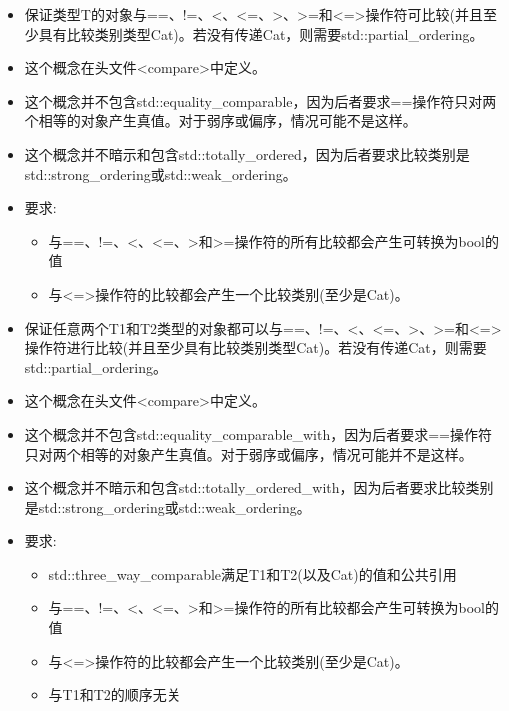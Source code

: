 

\begin{itemize}
\item
保证类型T的对象与==、!=、<、<=、>、>=和<=>操作符可比较(并且至少具有比较类别类型Cat)。若没有传递Cat，则需要std::partial\_ordering。

\item
这个概念在头文件<compare>中定义。

\item
这个概念并不包含std::equality\_comparable，因为后者要求==操作符只对两个相等的对象产生真值。对于弱序或偏序，情况可能不是这样。

\item
这个概念并不暗示和包含std::totally\_ordered，因为后者要求比较类别是std::strong\_ordering或std::weak\_ordering。

\item
要求:
\begin{itemize}
\item
与==、!=、<、<=、>和>=操作符的所有比较都会产生可转换为bool的值

\item
与<=>操作符的比较都会产生一个比较类别(至少是Cat)。
\end{itemize}
\end{itemize}


\begin{itemize}
\item
保证任意两个T1和T2类型的对象都可以与==、!=、<、<=、>、>=和<=>操作符进行比较(并且至少具有比较类别类型Cat)。若没有传递Cat，则需要std::partial\_ordering。

\item
这个概念在头文件<compare>中定义。

\item
这个概念并不包含std::equality\_comparable\_with，因为后者要求==操作符只对两个相等的对象产生真值。对于弱序或偏序，情况可能并不是这样。

\item
这个概念并不暗示和包含std::totally\_ordered\_with，因为后者要求比较类别是std::strong\_ordering或std::weak\_ordering。

\item
要求:
\begin{itemize}
\item
std::three\_way\_comparable满足T1和T2(以及Cat)的值和公共引用

\item
与==、!=、<、<=、>和>=操作符的所有比较都会产生可转换为bool的值

\item
与<=>操作符的比较都会产生一个比较类别(至少是Cat)。

\item
与T1和T2的顺序无关
\end{itemize}
\end{itemize}




